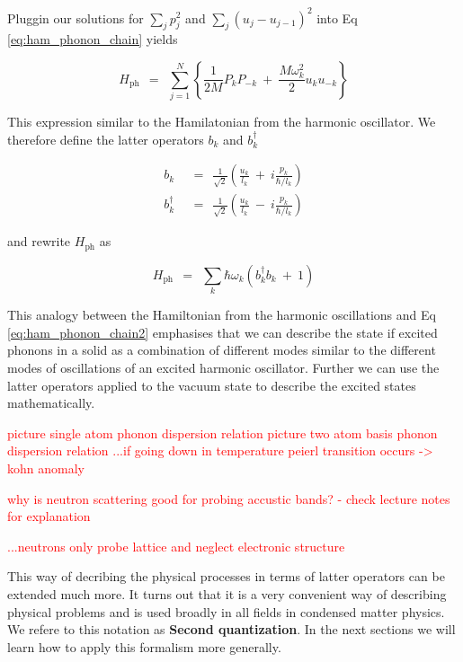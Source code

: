 \documentclass[10pt]{report}
\numberwithin{equation}{chapter}
\newcommand{\refEq}[1]{
  Eq  \ref{#1}
}
\begin{document}
Pluggin our solutions for $\sum_j p_j^2$ and $\sum_j (u_j-u_{j-1})^2$ into \refEq{eq:ham_phonon_chain} yields

\begin{equation}\label{eq:ham_phonon_chain2}
  H_\text{ph} ~~=~~ \sum_{j=1}^N \left\{ \frac{1}{2M} P_k P_{-k} ~+~ \frac{M \omega_k^2}{2} u_k u_{-k} \right\} 
\end{equation}

This expression similar to the Hamilatonian from the harmonic oscillator. We therefore define the latter operators $b_k$ and $b_k^\dag$

\begin{align}
  b_k ~~& =~~ \frac{1}{\sqrt{2}} \left( \frac{u_k}{l_k} ~+~ i \frac{p_k}{\hbar/l_k} \right)\\
  b_k^\dag ~~& =~~ \frac{1}{\sqrt{2}} \left( \frac{u_k}{l_k} ~-~ i\frac{p_k}{\hbar/l_k} \right)
\end{align}

and rewrite $H_\text{ph}$ as 

\begin{equation}
  H_\text{ph} ~~=~~ \sum_k \hbar \omega_k (b^\dag_k b_k ~+~ 1)
\end{equation}

This analogy between the Hamiltonian from the harmonic oscillations and \refEq{eq:ham_phonon_chain2} emphasises that we can describe the state if excited phonons in a solid as a combination of different modes similar to the different modes of oscillations of an excited harmonic oscillator. Further we can use the latter operators applied to the vacuum state to describe the excited states mathematically.

\textcolor{red}{picture single atom phonon dispersion relation}
\textcolor{red}{picture two atom basis phonon dispersion relation}
\textcolor{red}{...if going down in temperature peierl transition occurs -> kohn anomaly}

\textcolor{red}{why is neutron scattering good for probing accustic bands? - check lecture notes for explanation}

\textcolor{red}{...neutrons only probe lattice and neglect electronic structure}


This way of decribing the physical processes in terms of latter operators can be extended much more. It turns out that it is a very convenient way of describing physical problems and is used broadly in all fields in condensed matter physics. We refere to this notation as \textbf{Second quantization}. In the next sections we will learn how to apply this formalism more generally. 
\end{document}
